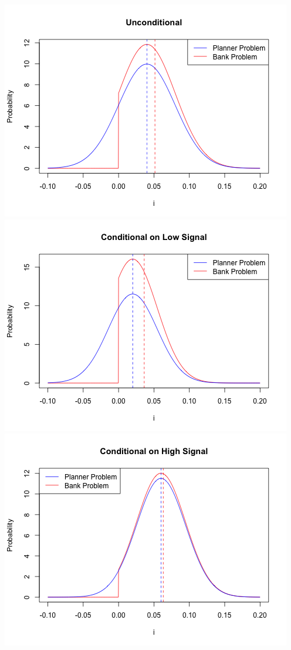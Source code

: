\documentclass[12pt]{article}
\begin{document}
\begin{center}
\includegraphics[scale=0.7]{ll_u}
\includegraphics[scale=0.7]{ll_low}
\includegraphics[scale=0.7]{ll_high}
\end{center}
\end{document}
